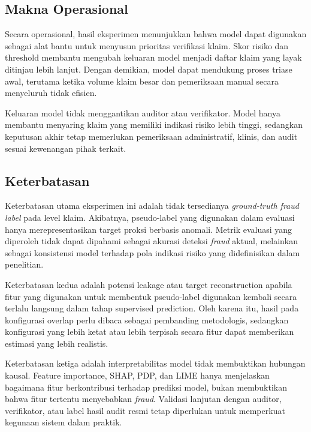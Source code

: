\subsection{Makna Operasional}\label{makna-operasional}

Secara operasional, hasil eksperimen menunjukkan bahwa model dapat digunakan sebagai alat bantu untuk menyusun prioritas verifikasi klaim. Skor risiko dan threshold membantu mengubah keluaran model menjadi daftar klaim yang layak ditinjau lebih lanjut. Dengan demikian, model dapat mendukung proses triase awal, terutama ketika volume klaim besar dan pemeriksaan manual secara menyeluruh tidak efisien.

Keluaran model tidak menggantikan auditor atau verifikator. Model hanya membantu menyaring klaim yang memiliki indikasi risiko lebih tinggi, sedangkan keputusan akhir tetap memerlukan pemeriksaan administratif, klinis, dan audit sesuai kewenangan pihak terkait.

\subsection{Keterbatasan}\label{keterbatasan-eksperimen-bab4}

Keterbatasan utama eksperimen ini adalah tidak tersedianya \emph{ground-truth fraud label} pada level klaim. Akibatnya, pseudo-label yang digunakan dalam evaluasi hanya merepresentasikan target proksi berbasis anomali. Metrik evaluasi yang diperoleh tidak dapat dipahami sebagai akurasi deteksi \emph{fraud} aktual, melainkan sebagai konsistensi model terhadap pola indikasi risiko yang didefinisikan dalam penelitian.

Keterbatasan kedua adalah potensi leakage atau target reconstruction apabila fitur yang digunakan untuk membentuk pseudo-label digunakan kembali secara terlalu langsung dalam tahap supervised prediction. Oleh karena itu, hasil pada konfigurasi overlap perlu dibaca sebagai pembanding metodologis, sedangkan konfigurasi yang lebih ketat atau lebih terpisah secara fitur dapat memberikan estimasi yang lebih realistis.

Keterbatasan ketiga adalah interpretabilitas model tidak membuktikan hubungan kausal. Feature importance, SHAP, PDP, dan LIME hanya menjelaskan bagaimana fitur berkontribusi terhadap prediksi model, bukan membuktikan bahwa fitur tertentu menyebabkan \emph{fraud}. Validasi lanjutan dengan auditor, verifikator, atau label hasil audit resmi tetap diperlukan untuk memperkuat kegunaan sistem dalam praktik.

